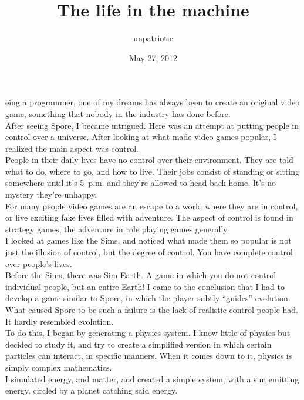 \documentclass[a5paper]{scrartcl}
\title{The life in the machine}
\author{unpatriotic}
\date{May 27, 2012}
\begin{document}
\maketitle

eing a programmer, one of my dreams has always been to create an original video game, something that nobody in the industry has done before.\\


After seeing Spore, I became intrigued. Here was an attempt at putting people in control over a universe. After looking at what made video games popular, I realized the main aspect was control.\\


People in their daily lives have no control over their environment. They are told what to do, where to go, and how to live. Their jobs consist of standing or sitting somewhere until it's 5~p.m. and they're allowed to head back home. It's no mystery they're unhappy.\\


For many people video games are an escape to a world where they are in control, or live exciting fake lives filled with adventure. The aspect of control is found in strategy games, the adventure in role playing games generally.\\


I looked at games like the Sims, and noticed what made them so popular is not just the illusion of control, but the degree of control. You have complete control over people's lives.\\


Before the Sims, there was Sim Earth. A game in which you do not control individual people, but an entire Earth! I came to the conclusion that I had to develop a game similar to Spore, in which the player subtly \enquote{guides} evolution. What caused Spore to be such a failure is the lack of realistic control people had. It hardly resembled evolution.\\


To do this, I began by generating a physics system. I know little of physics but decided to study it, and try to create a simplified version in which certain particles can interact, in specific manners. When it comes down to it, physics is simply complex mathematics.\\


I simulated energy, and matter, and created a simple system, with a sun emitting energy, circled by a planet catching said energy.\\
\end{document}
